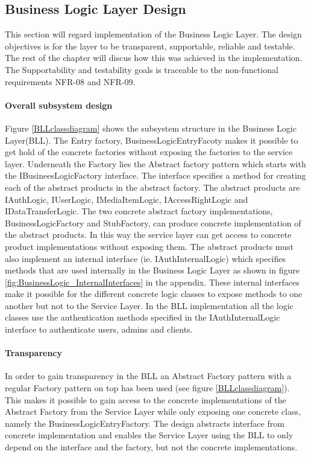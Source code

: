 \documentclass[../report.tex]{subfiles}
\begin{document}
\graphicspath{{img/}{../img/}}

\subsection{Business Logic Layer Design}

This section will regard implementation of the Business Logic Layer. The design objectives is for the layer to be transparent, supportable, reliable and testable. The rest of the chapter will discus how this was achieved in the implementation. The Supportability and testability goals is traceable to the non-functional requirements NFR-08 and NFR-09.

\paragraph{Overall subsystem design}
Figure \ref{BLLclassdiagram} shows the subsystem structure in the Business Logic Layer(BLL). The Entry factory, BusinessLogicEntryFacoty makes it possible to get hold of the concrete factories without exposing the factories to the service layer. Underneath the Factory lies the Abstract factory pattern which starts with the IBusineesLogicFactory interface. The interface specifies a method for creating each of the abstract products in the abstract factory. The abstract products are IAuthLogic, IUserLogic, IMediaItemLogic, IAccessRightLogic and IDataTransferLogic. The two concrete abstract factory implementations, BusinessLogicFactory and StubFactory, can produce concrete implementation of the abstract products. In this way the service layer can get access to concrete product implementations without exposing them. The abstract products must also implement an internal interface (ie. IAuthInternalLogic) which specifies methods that are used internally in the Business Logic Layer as shown in figure \ref{fig:BusinessLogic_InternalInterfaces} in the appendix. These internal interfaces make it possible for the different concrete logic classes to expose methods to one another but not to the Service Layer. In the BLL implementation all the logic classes use the authentication methods specified in the IAuthInternalLogic interface to authenticate users, admins and clients.

\paragraph{Transparency} 
In order to gain transparency in the BLL an Abstract Factory pattern with a regular Factory pattern on top has been used (see figure \ref{BLLclassdiagram}). This makes it possible to gain access to the concrete implementations of the Abstract Factory from the Service Layer while only exposing one concrete class, namely the BusinessLogicEntryFactory. The design abstracts interface from concrete implementation and enables the Service Layer using the BLL to only depend on the interface and the factory, but not the concrete implementations.
\end{document}
